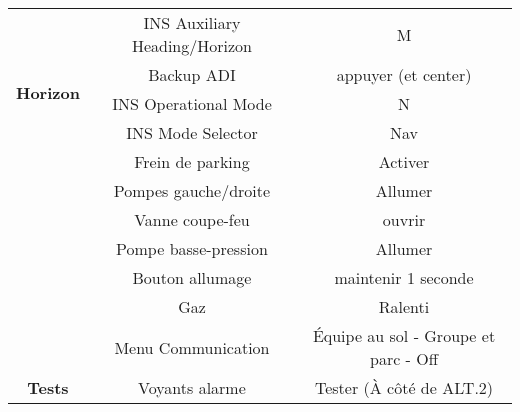 \documentclass[12pt]{article}
\begin{document}
\begin{tabular}{|c|c|c|}
  \hline
  \multirow{5}{*}{\textbf{Horizon}}
  & INS Auxiliary Heading/Horizon & M \\
  & Backup ADI & appuyer (et center) \\
  & INS Operational Mode & N \\
  & INS Mode Selector & Nav \\
  & Frein de parking & Activer\\
  & Pompes gauche/droite & Allumer \\
  & Vanne coupe-feu & ouvrir \\
  & Pompe basse-pression  & Allumer \\
  & Bouton allumage & maintenir 1 seconde \\
  & Gaz & Ralenti \\
  & Menu Communication &  Équipe au sol - Groupe et parc - Off \\
  \hline
  \multirow{1}{*}{\textbf{Tests}}
  & Voyants alarme & Tester (À côté de ALT.2)\\
  \hline

\end{tabular}
\end{document}
